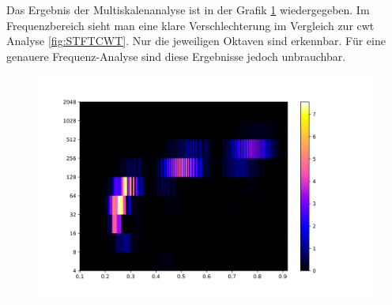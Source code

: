 Das Ergebnis der Multiskalenanalyse ist in der Grafik \ref{fig:sin-sweep} wiedergegeben. Im Frequenzbereich sieht man eine klare Verschlechterung im Vergleich zur cwt Analyse  \ref{fig:STFTCWT}. Nur die jeweiligen Oktaven sind erkennbar. Für eine genauere Frequenz-Analyse sind diese Ergebnisse jedoch unbrauchbar.  


\begin{figure}[!ht]
	\centering
	\includegraphics[width=\linewidth]{papers/autotune/sections/frequenzanalyse/images/sweepdwt.jpg}
	\label{fig:sin-sweep}
\end{figure}%




